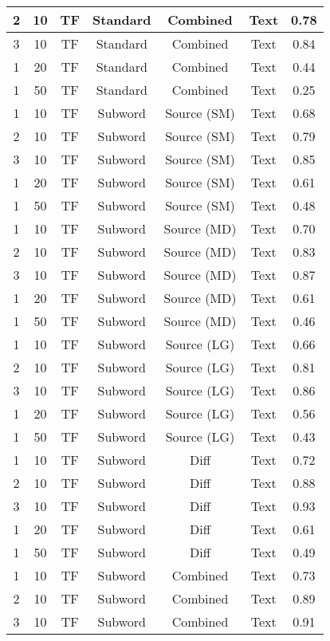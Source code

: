 \begin{longtable}{|c|c|c|c|c|c|c|}
\hline
2 & 10 & TF & Standard & Combined & Text & 0.78 \\
\hline
3 & 10 & TF & Standard & Combined & Text & 0.84 \\
\hline
1 & 20 & TF & Standard & Combined & Text & 0.44 \\
\hline
1 & 50 & TF & Standard & Combined & Text & 0.25 \\
\hline
1 & 10 & TF & Subword & Source (SM) & Text & 0.68 \\
\hline
2 & 10 & TF & Subword & Source (SM) & Text & 0.79 \\
\hline
3 & 10 & TF & Subword & Source (SM) & Text & 0.85 \\
\hline
1 & 20 & TF & Subword & Source (SM) & Text & 0.61 \\
\hline
1 & 50 & TF & Subword & Source (SM) & Text & 0.48 \\
\hline
1 & 10 & TF & Subword & Source (MD) & Text & 0.70 \\
\hline
2 & 10 & TF & Subword & Source (MD) & Text & 0.83 \\
\hline
3 & 10 & TF & Subword & Source (MD) & Text & 0.87 \\
\hline
1 & 20 & TF & Subword & Source (MD) & Text & 0.61 \\
\hline
1 & 50 & TF & Subword & Source (MD) & Text & 0.46 \\
\hline
1 & 10 & TF & Subword & Source (LG) & Text & 0.66 \\
\hline
2 & 10 & TF & Subword & Source (LG) & Text & 0.81 \\
\hline
3 & 10 & TF & Subword & Source (LG) & Text & 0.86 \\
\hline
1 & 20 & TF & Subword & Source (LG) & Text & 0.56 \\
\hline
1 & 50 & TF & Subword & Source (LG) & Text & 0.43 \\
\hline
1 & 10 & TF & Subword & Diff & Text & 0.72 \\
\hline
2 & 10 & TF & Subword & Diff & Text & 0.88 \\
\hline
3 & 10 & TF & Subword & Diff & Text & 0.93 \\
\hline
1 & 20 & TF & Subword & Diff & Text & 0.61 \\
\hline
1 & 50 & TF & Subword & Diff & Text & 0.49 \\
\hline
1 & 10 & TF & Subword & Combined & Text & 0.73 \\
\hline
2 & 10 & TF & Subword & Combined & Text & 0.89 \\
\hline
3 & 10 & TF & Subword & Combined & Text & 0.91 \\

\end{longtable}
